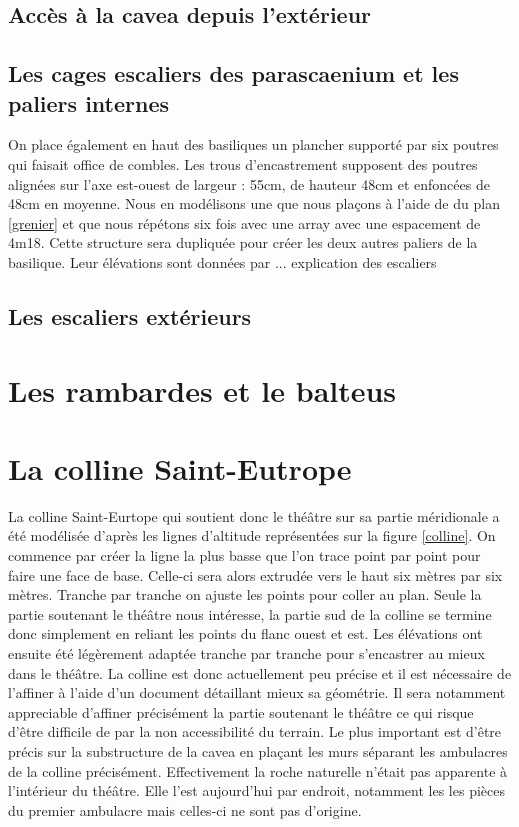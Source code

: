 \subsection{Accès à la cavea depuis l'extérieur}

\subsection{Les cages escaliers des \gls{parascaenium} et les paliers internes}


On place également en haut des basiliques un plancher supporté par six poutres qui faisait office de combles. Les trous d'encastrement supposent des poutres alignées sur l'axe est-ouest de largeur : 55cm, de hauteur 48cm et enfoncées de 48cm en moyenne. Nous en modélisons une que nous plaçons à l'aide de du plan \ref{grenier} et que nous répétons six fois avec une \gls{array} avec une espacement de 4m18. Cette structure sera dupliquée pour créer les deux autres paliers de la basilique. Leur élévations sont données par ... explication des escaliers

\subsection{Les escaliers extérieurs}

\section{Les rambardes et le \gls{balteus}} 

\section{La colline Saint-Eutrope} 
La colline Saint-Eurtope qui soutient donc le théâtre sur sa partie méridionale a été modélisée d'après les lignes d'altitude représentées sur la figure \ref{colline}. On commence par créer la ligne la plus basse que l'on trace point par point pour faire une face de base. Celle-ci sera alors extrudée vers le haut six mètres par six mètres. Tranche par tranche on ajuste les points pour coller au plan. Seule la partie soutenant le théâtre nous intéresse, la partie sud de la colline se termine donc simplement en reliant les points du flanc ouest et est. Les élévations ont ensuite été légèrement adaptée tranche par tranche pour s'encastrer au mieux dans le théâtre. La colline est donc actuellement peu précise et il est nécessaire de l'affiner à l'aide d'un document détaillant mieux sa géométrie. Il sera notamment appreciable d'affiner précisément la partie soutenant le théâtre ce qui risque d'être difficile de par la non accessibilité du terrain. Le plus important est d'être précis sur la substructure de la cavea en plaçant les murs séparant les ambulacres de la colline précisément. Effectivement la roche naturelle n'était pas apparente à l'intérieur du théâtre. Elle l'est aujourd'hui par endroit, notamment les les pièces du premier ambulacre mais celles-ci ne sont pas d'origine.

